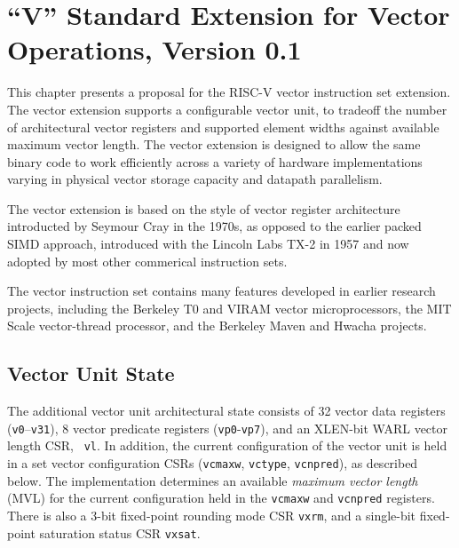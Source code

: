 \chapter{``V'' Standard Extension for Vector Operations, Version 0.1}
\label{sec:bits}

This chapter presents a proposal for the RISC-V vector instruction set
extension.  The vector extension supports a configurable vector unit,
to tradeoff the number of architectural vector registers and supported
element widths against available maximum vector length.  The vector
extension is designed to allow the same binary code to work
efficiently across a variety of hardware implementations varying in
physical vector storage capacity and datapath parallelism.

\begin{commentary}
The vector extension is based on the style of vector register
architecture introducted by Seymour Cray in the 1970s, as opposed to
the earlier packed SIMD approach, introduced with the Lincoln Labs
TX-2 in 1957 and now adopted by most other commerical instruction
sets.

The vector instruction set contains many features developed in earlier
research projects, including the Berkeley T0 and VIRAM vector
microprocessors, the MIT Scale vector-thread processor, and the
Berkeley Maven and Hwacha projects.
\end{commentary}

\section{Vector Unit State}

The additional vector unit architectural state consists of 32 vector
data registers ({\tt v0}--{\tt v31}), 8 vector predicate registers
({\tt vp0}-{\tt vp7}), and an XLEN-bit WARL vector length CSR, {\tt
  vl}.  In addition, the current configuration of the vector unit is
held in a set vector configuration CSRs ({\tt vcmaxw}, {\tt vctype},
{\tt vcnpred}), as described below.  The implementation determines an
available {\em maximum vector length} (MVL) for the current
configuration held in the {\tt vcmaxw} and {\tt vcnpred} registers.
There is also a 3-bit fixed-point rounding mode CSR {\tt vxrm}, and a
single-bit fixed-point saturation status CSR {\tt vxsat}.

